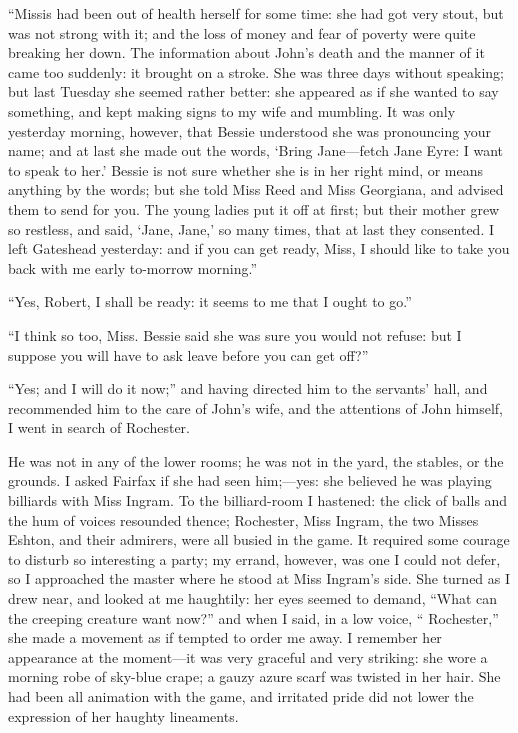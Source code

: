 \enquote{Missis had been out of health herself for some time: she had
got very stout, but was not strong with it; and the loss of money and
fear of poverty were quite breaking her down. The information about \Mr{}
John's death and the manner of it came too suddenly: it brought on a
stroke. She was three days without speaking; but last Tuesday she
seemed rather better: she appeared as if she wanted to say something,
and kept making signs to my wife and mumbling. It was only yesterday
morning, however, that Bessie understood she was pronouncing your name;
and at last she made out the words, \enquote{Bring Jane---fetch Jane
Eyre: I want to speak to her.} Bessie is not sure whether she is in her
right mind, or means anything by the words; but she told Miss Reed and
Miss Georgiana, and advised them to send for you. The young ladies put
it off at first; but their mother grew so restless, and said,
\enquote{Jane, Jane,} so many times, that at last they consented. I
left Gateshead yesterday: and if you can get ready, Miss, I should like
to take you back with me early to-morrow morning.}

\enquote{Yes, Robert, I shall be ready: it seems to me that I ought to
go.}

\enquote{I think so too, Miss. Bessie said she was sure you would not
refuse: but I suppose you will have to ask leave before you can get
off?}

\enquote{Yes; and I will do it now;} and having directed him to the
servants' hall, and recommended him to the care of John's wife, and the
attentions of John himself, I went in search of \Mr{} Rochester.

He was not in any of the lower rooms; he was not in the yard, the
stables, or the grounds. I asked \Mrs{} Fairfax if she had seen
him;---yes: she believed he was playing billiards with Miss Ingram. To
the billiard-room I hastened: the click of balls and the hum of voices
resounded thence; \Mr{} Rochester, Miss Ingram, the two Misses Eshton, and
their admirers, were all busied in the game. It required some courage
to disturb so interesting a party; my errand, however, was one I could
not defer, so I approached the master where he stood at Miss Ingram's
side. She turned as I drew near, and looked at me haughtily: her eyes
seemed to demand, \enquote{What can the creeping creature want now?} and
when I said, in a low voice, \enquote{\Mr{} Rochester,} she made a
movement as if tempted to order me away. I remember her appearance at
the moment---it was very graceful and very striking: she wore a morning
robe of sky-blue crape; a gauzy azure scarf was twisted in her hair. 
She had been all animation with the game, and irritated pride did not
lower the expression of her haughty lineaments.

